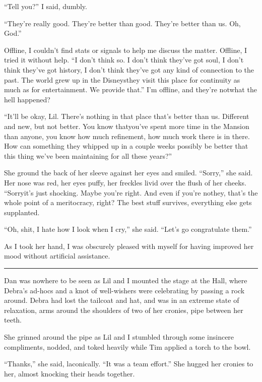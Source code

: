 “Tell you?” I said, dumbly.

“They're really good. They're better than good. They're better than
us. Oh, God.”

Offline, I couldn't find stats or signals to help me discuss the
matter. Offline, I tried it without help. “I don't think so. I
don't think they've got soul, I don't think they've got history, I
don't think they've got any kind of connection to the past. The
world grew up in the Disneys{\dash}they visit this place for continuity
as much as for entertainment. We provide that.” I'm offline, and
they're not{\dash}what the hell happened?

“It'll be okay, Lil. There's nothing in that place that's better
than us. Different and new, but not better. You know that{\dash}you've
spent more time in the Mansion than anyone, you know how much
refinement, how much work there is in there. How can something they
whipped up in a couple weeks possibly be better that this thing
we've been maintaining for all these years?”

She ground the back of her sleeve against her eyes and smiled.
“Sorry,” she said. Her nose was red, her eyes puffy, her freckles
livid over the flush of her cheeks. “Sorry{\dash}it's just shocking.
Maybe you're right. And even if you're not{\dash}hey, that's the whole
point of a meritocracy, right? The best stuff survives, everything
else gets supplanted.

“Oh, shit, I hate how I look when I cry,” she said. “Let's go
congratulate them.”

As I took her hand, I was obscurely pleased with myself for having
improved her mood without artificial assistance.

\begin{center}\rule{1in}{0.4pt}\end{center}

Dan was nowhere to be seen as Lil and I mounted the stage at the
Hall, where Debra's ad-hocs and a knot of well-wishers were
celebrating by passing a rock around. Debra had lost the tailcoat
and hat, and was in an extreme state of relaxation, arms around the
shoulders of two of her cronies, pipe between her teeth.

She grinned around the pipe as Lil and I stumbled through some
insincere compliments, nodded, and toked heavily while Tim applied
a torch to the bowl.

“Thanks,” she said, laconically. “It was a team effort.” She hugged
her cronies to her, almost knocking their heads together.

